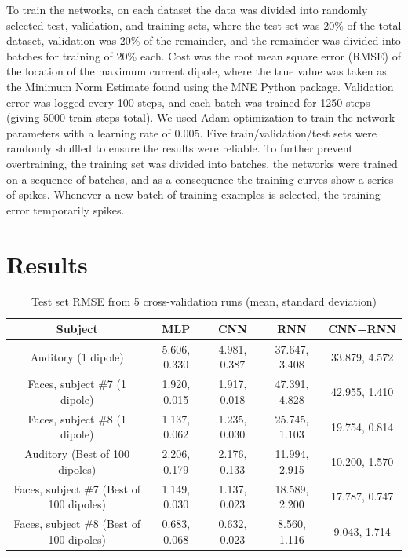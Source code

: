 \documentclass[journal,12pt,onecolumn,draftclsnofoot,]{IEEEtran}
\begin{document}
To train the networks, on each dataset the data was divided into randomly selected test, validation, and training sets, where the test set was 20\% of the total dataset, validation was 20\% of the remainder, and the remainder was divided into batches for training of 20\% each. Cost was the root mean square error (RMSE) of the location of the maximum current dipole, where the true value was taken as the Minimum Norm Estimate found using the MNE Python package. Validation error was logged every 100 steps, and each batch was trained for 1250 steps (giving 5000 train steps total). We used Adam optimization to train the network parameters \cite{kingma2014adam} with a learning rate of 0.005. Five train/validation/test sets were randomly shuffled to ensure the results were reliable. To further prevent overtraining, the training set was divided into batches, the networks were trained on a sequence of batches, and as a consequence the training curves show a series of spikes. Whenever a new batch of training examples is selected, the training error temporarily spikes.

\section{Results}

\begin{table}[h!]
  \centering
  \caption{Test set RMSE from 5 cross-validation runs (mean, standard deviation)}
  \begin{tabular}{c||c|c|c|c}
    \hline
    Subject & MLP & CNN & RNN & CNN+RNN\\
    \hline
    \hline
    Auditory (1 dipole) & 5.606, 0.330 & 4.981, 0.387 & 37.647, 3.408 & 33.879, 4.572 \\
    \hline
    Faces, subject \#7 (1 dipole) &  1.920, 0.015 & 1.917, 0.018 & 47.391, 4.828 & 42.955, 1.410 \\
    \hline
    Faces, subject \#8 (1 dipole) &  1.137, 0.062 & 1.235, 0.030 & 25.745, 1.103 & 19.754, 0.814 \\
    \hline
    Auditory (Best of 100 dipoles) & 2.206, 0.179 & 2.176, 0.133 & 11.994, 2.915 & 10.200, 1.570 \\
    \hline
    Faces, subject \#7 (Best of 100 dipoles) &  1.149, 0.030 & 1.137, 0.023 & 18.589, 2.200 & 17.787, 0.747 \\
    \hline
    Faces, subject \#8 (Best of 100 dipoles) &  0.683, 0.068 & 0.632, 0.023 & 8.560, 1.116 & 9.043, 1.714 \\
    \hline
  \end{tabular}
  \label{tab:results}
\end{table}
\end{document}
